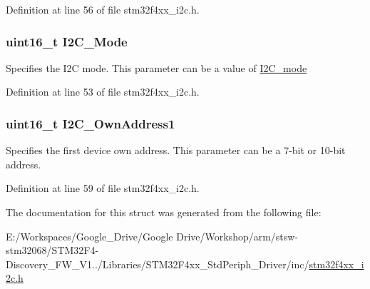 Definition at line 56 of file stm32f4xx\-\_\-i2c.\-h.

\hypertarget{struct_i2_c___init_type_def_a165269b65702e348e32ccd8029e65af1}{
\subsubsection[{I2\-C\-\_\-\-Mode}]{\setlength{\rightskip}{0pt plus 5cm}uint16\-\_\-t I2\-C\-\_\-\-Mode}}\label{struct_i2_c___init_type_def_a165269b65702e348e32ccd8029e65af1}
Specifies the I2\-C mode. This parameter can be a value of \hyperlink{group___i2_c__mode}{I2\-C\-\_\-mode} 

Definition at line 53 of file stm32f4xx\-\_\-i2c.\-h.

\hypertarget{struct_i2_c___init_type_def_ae62dca9cea4fdb3eb8f9554b5f35fe4f}{
\subsubsection[{I2\-C\-\_\-\-Own\-Address1}]{\setlength{\rightskip}{0pt plus 5cm}uint16\-\_\-t I2\-C\-\_\-\-Own\-Address1}}\label{struct_i2_c___init_type_def_ae62dca9cea4fdb3eb8f9554b5f35fe4f}
Specifies the first device own address. This parameter can be a 7-\/bit or 10-\/bit address. 

Definition at line 59 of file stm32f4xx\-\_\-i2c.\-h.



The documentation for this struct was generated from the following file\-:\begin{DoxyCompactItemize}
\item 
E\-:/\-Workspaces/\-Google\-\_\-\-Drive/\-Google Drive/\-Workshop/arm/stsw-\/stm32068/\-S\-T\-M32\-F4-\/\-Discovery\-\_\-\-F\-W\-\_\-\-V1../\-Libraries/\-S\-T\-M32\-F4xx\-\_\-\-Std\-Periph\-\_\-\-Driver/inc/\hyperlink{stm32f4xx__i2c_8h}{stm32f4xx\-\_\-i2c.\-h}\end{DoxyCompactItemize}
